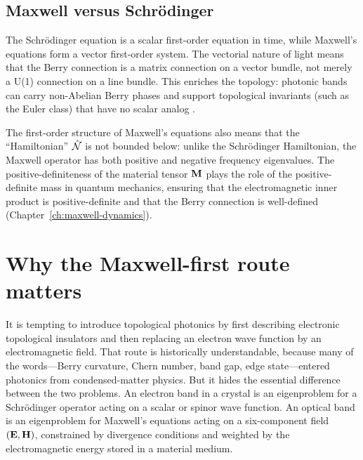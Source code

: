 \subsection{Maxwell versus Schrödinger}
\label{sec:ch1-maxwell-vs-schrodinger}

The Schrödinger equation is a scalar first-order equation in time,
while Maxwell's equations form a vector first-order system.  The
vectorial nature of light means that the Berry connection is a matrix
connection on a vector bundle, not merely a U(1) connection on a
line bundle.  This enriches the topology: photonic bands can carry
non-Abelian Berry phases and support topological invariants (such as
the Euler class) that have no scalar analog
\cite{ozawa2018topological,price2022roadmap}.

The first-order structure of Maxwell's equations also means that the
``Hamiltonian'' $\hat{\mathcal{N}}$ is not bounded below: unlike the Schrödinger
Hamiltonian, the Maxwell operator has both positive and negative
frequency eigenvalues.  The positive-definiteness of the material
tensor $\mathbf{M}$ plays the role of the positive-definite mass in
quantum mechanics, ensuring that the electromagnetic inner product
is positive-definite and that the Berry connection is well-defined
(Chapter~\ref{ch:maxwell-dynamics}).

\section{Why the Maxwell-first route matters}
\label{sec:ch1-maxwell-first-route}

It is tempting to introduce topological photonics by first describing
electronic topological insulators and then replacing an electron wave
function by an electromagnetic field.  That route is historically
understandable, because many of the words---Berry curvature, Chern
number, band gap, edge state---entered photonics from condensed-matter
physics.  But it hides the essential difference between the two
problems.  An electron band in a crystal is an eigenproblem for a
Schrödinger operator acting on a scalar or spinor wave function.  An
optical band is an eigenproblem for Maxwell's equations acting on a
six-component field $(\mathbf{E},\mathbf{H})$, constrained by divergence
conditions and weighted by the electromagnetic energy stored in a
material medium.

